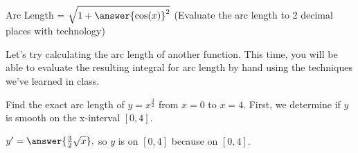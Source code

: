 \documentclass{ximera}
\begin{document}
\begin{problem}

Arc Length = $\sqrt{1+{\answer{\cos(x)}^2}}$ (Evaluate the arc length to 2 decimal places with technology)

\end{problem}

Let's try calculating the arc length of another function.  This time, you will be able to evaluate the resulting integral for arc length by hand using the techniques we've learned in class.

\begin{problem}

Find the exact arc length of $y = x^{\frac{3}{2}}$ from $x=0$ to $x=4$.  First, we determine if $y$ is smooth on the x-interval $[0,4]$.  

$y' = \answer{\frac{3}{2}\sqrt{x}},$ so $y$ is  on $[0,4]$ because  on $[0,4]$.  

\end{problem}
\end{document}
